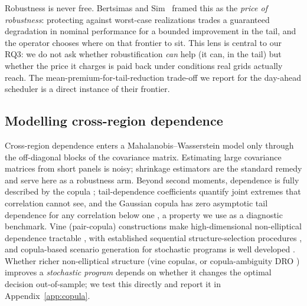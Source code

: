 \documentclass[12pt]{article}
\begin{document}
Robustness is never free. Bertsimas and Sim~\citep{bertsimas2004} framed this as the
\emph{price of robustness}: protecting against worst-case realizations trades a
guaranteed degradation in nominal performance for a bounded improvement in the tail, and
the operator chooses where on that frontier to sit. This lens is central to our RQ3: we
do not ask whether robustification \emph{can} help (it can, in the tail) but whether the
price it charges is paid back under conditions real grids actually reach. The
mean-premium-for-tail-reduction trade-off we report for the day-ahead scheduler is a
direct instance of their frontier.

\subsection{Modelling cross-region dependence}
Cross-region dependence enters a Mahalanobis--Wasserstein model only through the
off-diagonal blocks of the covariance matrix. Estimating large covariance matrices
from short panels is noisy; shrinkage estimators \citep{ledoit2004} are the standard
remedy and serve here as a robustness arm. Beyond second moments, dependence is
fully described by the copula \citep{sklar1959,joe2014}; tail-dependence
coefficients quantify joint extremes that correlation cannot see, and the Gaussian
copula has zero asymptotic tail dependence for any correlation below one
\citep{embrechts2002}, a property we use as a diagnostic benchmark.
Vine (pair-copula) constructions make high-dimensional non-elliptical dependence
tractable \citep{aas2009,joe2014,czado2019}, with established sequential
structure-selection procedures \citep{dissmann2013}, and copula-based scenario
generation for stochastic programs is well developed \citep{kaut2014}. Whether richer
non-elliptical structure (vine copulas, or copula-ambiguity DRO \citep{fan2024})
improves a \emph{stochastic program} depends on whether it changes the optimal decision
out-of-sample; we test this directly and report it in Appendix~\ref{app:copula}.
\end{document}
